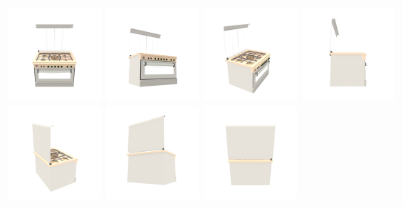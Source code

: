 \begin{figure}[htbp]
  \centering
  \includegraphics[width=0.22\textwidth]{images/data/samples/obj3/000.jpeg}\hfill
  \includegraphics[width=0.22\textwidth]{images/data/samples/obj3/001.jpeg}\hfill
  \includegraphics[width=0.22\textwidth]{images/data/samples/obj3/002.jpeg}\hfill
  \includegraphics[width=0.22\textwidth]{images/data/samples/obj3/003.jpeg}\\
  \includegraphics[width=0.22\textwidth]{images/data/samples/obj3/004.jpeg}\hfill
  \includegraphics[width=0.22\textwidth]{images/data/samples/obj3/005.jpeg}\hfill
  \includegraphics[width=0.22\textwidth]{images/data/samples/obj3/006.jpeg}\hfill

\end{figure}
